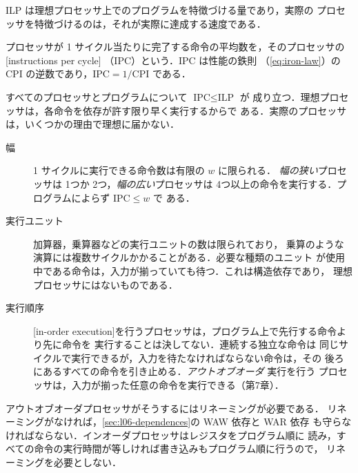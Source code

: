 \documentclass[../main.tex]{subfiles}
\begin{document}
ILP は理想プロセッサ上でのプログラムを特徴づける量であり，実際の
プロセッサを特徴づけるのは，それが実際に達成する速度である．

\begin{definition}[サイクル当たり命令数]
  \label{def:l06-ipc}
  プロセッサが 1 サイクル当たりに完了する命令の平均数を，そのプロセッサの
  [instructions per cycle]%
  （IPC）という．IPC は性能の鉄則
  （\cref{eq:iron-law}）の CPI の逆数であり，$\text{IPC} =
  1/\text{CPI}$ である．%
\end{definition}

すべてのプロセッサとプログラムについて $\text{IPC} \le \text{ILP}$ が
成り立つ．理想プロセッサは，各命令を依存が許す限り早く実行するからで
ある．実際のプロセッサは，いくつかの理由で理想に届かない．
\begin{description}
  \item[幅] 1 サイクルに実行できる命令数は有限の $w$ に限られる．
    \emph{幅の狭い}プロセッサは 1つか 2つ，\emph{幅の広い}プロセッサは
    4つ以上の命令を実行する．プログラムによらず $\text{IPC} \le w$ で
    ある．%
  \item[実行ユニット] 加算器，乗算器などの実行ユニットの数は限られており，
    乗算のような演算には複数サイクルかかることがある．必要な種類のユニット
    が使用中である命令は，入力が揃っていても待つ．これは構造依存であり，
    理想プロセッサにはないものである．
  \item[実行順序] [in-order
    execution]を行うプロセッサは，プログラム上で先行する命令より先に命令を
    実行することは決してない．連続する独立な命令は
    同じサイクルで実行できるが，入力を待たなければならない命令は，その
    後ろにあるすべての命令を引き止める．\emph{アウトオブオーダ}%
    実行を行う
    プロセッサは，入力が揃った任意の命令を実行できる（第7章）．
\end{description}
アウトオブオーダプロセッサがそうするにはリネーミングが必要である．
リネーミングがなければ，\cref{sec:l06-dependences}の WAW 依存と WAR 依存
も守らなければならない．インオーダプロセッサはレジスタをプログラム順に
読み，すべての命令の実行時間が等しければ書き込みもプログラム順に行うので，
リネーミングを必要としない．
\end{document}
